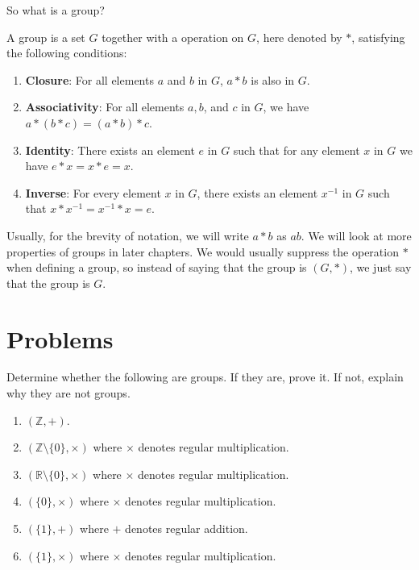 So what is a group?
\begin{definition}
    A group is a set $G$ together with a operation on $G$, here denoted by $\ast$, satisfying the following conditions:
    \begin{enumerate}
        \item \textbf{Closure}: For all elements $a$ and $b$ in $G$, $a \ast b$ is also in $G$.
        \item \textbf{Associativity}: For all elements $a, b$, and $c$ in $G$, we have $a \ast (b \ast c) = (a \ast b) \ast c$.
        \item \textbf{Identity}: There exists an element $e$ in $G$ such that for any element $x$ in $G$ we have $e \ast x = x \ast e = x$.
        \item \textbf{Inverse}: For every element $x$ in $G$, there exists an element $x^{-1}$ in $G$ such that $x \ast x^{-1} = x^{-1} \ast x = e$.
    \end{enumerate}
\end{definition}

\newpage

Usually, for the brevity of notation, we will write $a \ast b$ as $ab$. We will look at more properties of groups in later chapters. We would usually suppress the operation $\ast$ when defining a group, so instead of saying that the group is $(G, \ast)$, we just say that the group is $G$.

\newpage

\section{Problems}
\begin{problem}
Determine whether the following are groups. If they are, prove it. If not, explain why they are not groups.
\begin{enumerate}[label=(\alph*)]
    \item $(\mathbb{Z}, +)$.
    \item $(\mathbb{Z} \setminus \{0\}, \times)$ where $\times$ denotes regular multiplication.
    \item $(\mathbb{R} \setminus \{0\}, \times)$ where $\times$ denotes regular multiplication.
    \item $(\{0\}, \times)$ where $\times$ denotes regular multiplication.
    \item $(\{1\}, +)$ where $+$ denotes regular addition.
    \item $(\{1\}, \times)$ where $\times$ denotes regular multiplication.
\end{enumerate}
\end{problem}

